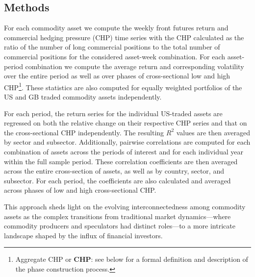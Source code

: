 \documentclass[
  authoryear,
  preprint,
  3p]{elsarticle}
\begin{document}
\subsection{Methods}\label{sec-methods}

For each commodity asset we compute the weekly front futures return and
commercial hedging pressure (CHP) time series with the CHP calculated as
the ratio of the number of long commercial positions to the total number
of commercial positions for the considered asset-week combination. For
each asset-period combination we compute the average return and
corresponding volatility over the entire period as well as over phases
of cross-sectional low and high CHP\footnote{Aggregate CHP or
  \textbf{CHP}: see below for a formal definition and description of the
  phase construction process.}. These statistics are also computed for
equally weighted portfolios of the US and GB traded commodity assets
independently.

For each period, the return series for the individual US-traded assets
are regressed on both the relative change on their respective CHP series
and that on the cross-sectional CHP independently. The resulting
\(R^{2}\) values are then averaged by sector and subsector.
Additionally, pairwise correlations are computed for each combination of
assets across the periods of interest and for each individual year
within the full sample period. These correlation coefficients are then
averaged across the entire cross-section of assets, as well as by
country, sector, and subsector. For each period, the coefficients are
also calculated and averaged across phases of low and high
cross-sectional CHP.

This approach sheds light on the evolving interconnectedness among
commodity assets as the complex transitions from traditional market
dynamics---where commodity producers and speculators had distinct
roles---to a more intricate landscape shaped by the influx of financial
investors.

\bigskip
\bigskip
\end{document}
